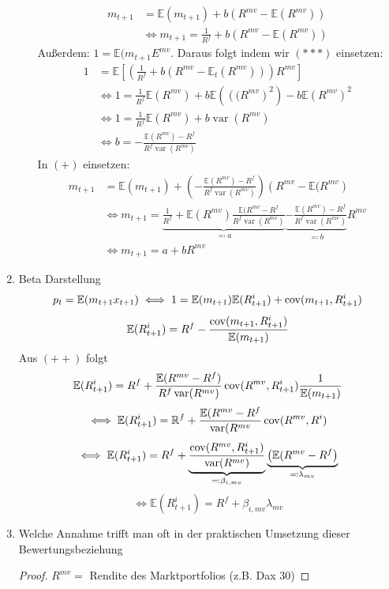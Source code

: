 \documentclass[12pt]{extreport} %
\newcommand{\R}{\mathbb{R}}
\theoremstyle{named}
\theoremstyle{nnamed}
\theoremstyle{itshape}
\theoremstyle{normal}
\begin{document}
\begin{enumerate}
\begin{itemize}
				\begin{align*}
					m_{t+1} & = \mathbb{E}(m_{t+1}) + b \left( R^{mv} - \mathbb{E}(R^{mv}) \right) \tag*{$(+)$} \\
						& \iff m_{t+1} = \frac{1}{R^f} + b \left( R^{mv} - \mathbb{E}(R^{mv}) \right)  \tag*{$(***)$}
				\end{align*}
				Außerdem: $1 = \mathbb{E}(m_{t+1} E^{mv}$. Daraus folgt indem wir $(***)$ einsetzen:
					\begin{align*}
						1 & = \mathbb{E} \left[ \left( \frac{1}{R^f} + b \left( R^{mv} - \mathbb{E}_t \left( R^{mv} \right) \right) \right) R^{mv} \right] \\
						& \iff 1 = \frac{1}{R^f} \mathbb{E}(R^{mv}) + b \mathbb{E}\left( \left((R^{mv} \right)^2 \right) - b \mathbb{E} \left(R^{mv} \right)^2 \\
						& \iff 1 = \frac{1}{R^f} \mathbb{E}(R^{mv}) + b \operatorname{var}(R^{mv}) \\
						& \iff b = - \frac{\mathbb{E}(R^{mv}) - R^f}{R^f \operatorname{var}(R^{mv})}
					\end{align*} 
					In $(+)$ einsetzen:
					\begin{align*}
						m_{t+1} & = \mathbb{E}(m_{t+1}) + \left( - \frac{\mathbb{E}(R^{mv}) - R^f}{R^f \operatorname{var}(R^{mv})} \right) \left( R^{mv} - \mathbb{E}(R^{mv} \right) \\
						& \iff m_{t+1} = \underbrace{\frac{1}{R^f} + \mathbb{E}(R^{mv}) \frac{\mathbb{E}(R^{mv} - R^f}{R^f \operatorname{var}(R^{mv})}}_{\eqqcolon a} \underbrace{- \frac{\mathbb{E}(R^{mv}) - R^f}{R^f \operatorname{var}(R^{mv})}}_{\eqqcolon b} R^{mv} \tag*{$(++)$} \\
						& \iff m_{t+1} = a + b R^{mv}
					\end{align*} 
		\end{itemize}
		\item Beta Darstellung
			$$ p_{t} = \mathbb{E}(m_{t+1} x_{t+1}) \iff 1 = \mathbb{E}(m_{t+1}) \mathbb{E}(R^i_{t+1}) + \operatorname{cov}(m_{t+1}, R^i_{t+1}) $$
			$$ \mathbb{E}(R_{t+1}^i) = R^f - \frac{\operatorname{cov}(m_{t+1}, R_{t+1}^i)}{\mathbb{E}(m_{t+1})} $$
			Aus $(++)$ folgt
			$$ \mathbb{E}(R_{t+1}^i) = R^f + \frac{\mathbb{E}(R^{mv} - R^f)}{R^f \operatorname{var}(R^{mv})} \operatorname{cov}(R^{mv}, R_{t+1}^i) \frac{1}{\mathbb{E}(m_{t+1})} $$
			$$ \iff \mathbb{E}(R_{t+1}^i) = \R^f + \frac{\mathbb{E}(R^{mv} - R^f}{\operatorname{var}(R^{mv}} \cov(R^{mv}, R^i) $$
			$$ \iff \mathbb{E}(R^i_{t+1}) = R^{f} + \underbrace{\frac{\operatorname{cov}(R^{mv}, R^{i}_{t+1})}{\operatorname{var}(R^{mv})}}_{\eqqcolon \beta_{i, mv}} \underbrace{\left( \mathbb{E}(R^{mv} - R^f \right)}_{\eqqcolon \lambda_{mv}} $$
			$$ \iff \mathbb{E}(R^i_{t+1}) = R^f + \beta_{i, mv} \lambda_{mv} $$
		\item Welche Annahme trifft man oft in der praktischen Umsetzung dieser Bewertungsbeziehung
			\begin{proof}
				$R^{mv} =$ Rendite des Marktportfolios (z.B. Dax 30)
			\end{proof}
\end{enumerate}
\end{document}
